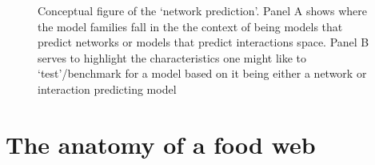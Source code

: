 \documentclass[
]{article}
\begin{document}
\begin{figure}


\caption{\label{fig-concept}Conceptual figure of the `network
prediction'. Panel A shows where the model families fall in the the
context of being models that predict networks or models that predict
interactions space. Panel B serves to highlight the characteristics one
might like to `test'/benchmark for a model based on it being either a
network or interaction predicting model}

\end{figure}%

\section{The anatomy of a food web}\label{sec-network-anatomy}
\end{document}

